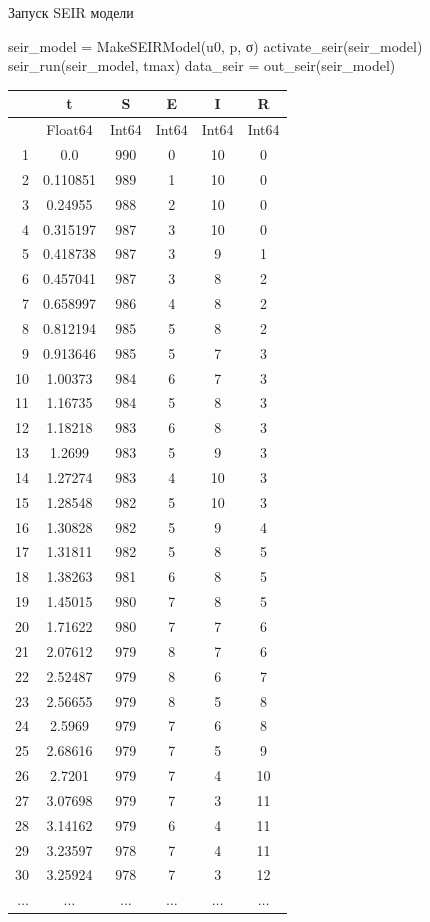 \documentclass[
  12pt,
  a4paper,
  DIV=11,
  numbers=noendperiod]{scrreprt}
\newenvironment{Shaded}{\begin{snugshade}}{\end{snugshade}}
\newcommand{\FunctionTok}[1]{\textcolor[rgb]{0.28,0.35,0.67}{#1}}
\newcommand{\NormalTok}[1]{\textcolor[rgb]{0.00,0.23,0.31}{#1}}
\newcommand{\OperatorTok}[1]{\textcolor[rgb]{0.37,0.37,0.37}{#1}}
\begin{document}
Запуск SEIR модели

\begin{Shaded}
\begin{Highlighting}[]
\NormalTok{seir\_model }\OperatorTok{=} \FunctionTok{MakeSEIRModel}\NormalTok{(u0, p, σ)}
\FunctionTok{activate\_seir}\NormalTok{(seir\_model)}
\FunctionTok{seir\_run}\NormalTok{(seir\_model, tmax)}
\NormalTok{data\_seir }\OperatorTok{=} \FunctionTok{out\_seir}\NormalTok{(seir\_model)}
\end{Highlighting}
\end{Shaded}

\begin{tabular}{r|ccccc}
    & t & S & E & I & R\\
    \hline
    & Float64 & Int64 & Int64 & Int64 & Int64\\
    \hline
    1 & 0.0 & 990 & 0 & 10 & 0 \\
    2 & 0.110851 & 989 & 1 & 10 & 0 \\
    3 & 0.24955 & 988 & 2 & 10 & 0 \\
    4 & 0.315197 & 987 & 3 & 10 & 0 \\
    5 & 0.418738 & 987 & 3 & 9 & 1 \\
    6 & 0.457041 & 987 & 3 & 8 & 2 \\
    7 & 0.658997 & 986 & 4 & 8 & 2 \\
    8 & 0.812194 & 985 & 5 & 8 & 2 \\
    9 & 0.913646 & 985 & 5 & 7 & 3 \\
    10 & 1.00373 & 984 & 6 & 7 & 3 \\
    11 & 1.16735 & 984 & 5 & 8 & 3 \\
    12 & 1.18218 & 983 & 6 & 8 & 3 \\
    13 & 1.2699 & 983 & 5 & 9 & 3 \\
    14 & 1.27274 & 983 & 4 & 10 & 3 \\
    15 & 1.28548 & 982 & 5 & 10 & 3 \\
    16 & 1.30828 & 982 & 5 & 9 & 4 \\
    17 & 1.31811 & 982 & 5 & 8 & 5 \\
    18 & 1.38263 & 981 & 6 & 8 & 5 \\
    19 & 1.45015 & 980 & 7 & 8 & 5 \\
    20 & 1.71622 & 980 & 7 & 7 & 6 \\
    21 & 2.07612 & 979 & 8 & 7 & 6 \\
    22 & 2.52487 & 979 & 8 & 6 & 7 \\
    23 & 2.56655 & 979 & 8 & 5 & 8 \\
    24 & 2.5969 & 979 & 7 & 6 & 8 \\
    25 & 2.68616 & 979 & 7 & 5 & 9 \\
    26 & 2.7201 & 979 & 7 & 4 & 10 \\
    27 & 3.07698 & 979 & 7 & 3 & 11 \\
    28 & 3.14162 & 979 & 6 & 4 & 11 \\
    29 & 3.23597 & 978 & 7 & 4 & 11 \\
    30 & 3.25924 & 978 & 7 & 3 & 12 \\
    $\dots$ & $\dots$ & $\dots$ & $\dots$ & $\dots$ & $\dots$ \\
\end{tabular}
\end{document}
